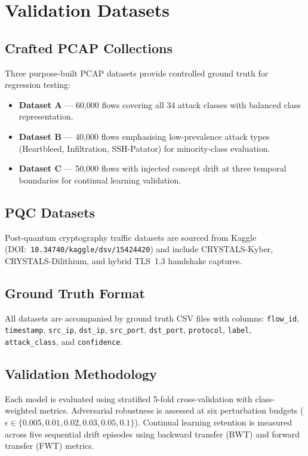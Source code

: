 \documentclass[11pt,a4paper]{article}
\begin{document}
\section{Validation Datasets}
\label{sec:datasets}

\subsection{Crafted PCAP Collections}
Three purpose-built PCAP datasets provide controlled ground truth for
regression testing:
\begin{itemize}
  \item \textbf{Dataset A} --- 60,000 flows covering all 34 attack classes
        with balanced class representation.
  \item \textbf{Dataset B} --- 40,000 flows emphasising low-prevalence
        attack types (Heartbleed, Infiltration, SSH-Patator) for
        minority-class evaluation.
  \item \textbf{Dataset C} --- 50,000 flows with injected concept drift
        at three temporal boundaries for continual learning validation.
\end{itemize}

\subsection{PQC Datasets}
Post-quantum cryptography traffic datasets are sourced from Kaggle
(DOI:~\texttt{10.34740/kaggle/dsv/15424420}) and include CRYSTALS-Kyber,
CRYSTALS-Dilithium, and hybrid TLS~1.3 handshake captures.

\subsection{Ground Truth Format}
All datasets are accompanied by ground truth CSV files with columns:
\texttt{flow\_id}, \texttt{timestamp}, \texttt{src\_ip}, \texttt{dst\_ip},
\texttt{src\_port}, \texttt{dst\_port}, \texttt{protocol}, \texttt{label},
\texttt{attack\_class}, and \texttt{confidence}.

\subsection{Validation Methodology}
Each model is evaluated using stratified 5-fold cross-validation with
class-weighted metrics.  Adversarial robustness is assessed at six
perturbation budgets ($\epsilon \in \{0.005, 0.01, 0.02, 0.03, 0.05, 0.1\}$).
Continual learning retention is measured across five sequential drift episodes
using backward transfer (BWT) and forward transfer (FWT) metrics.
\end{document}
